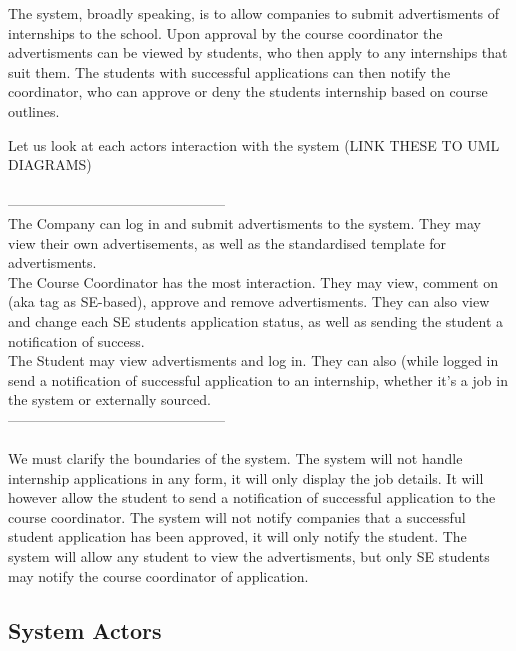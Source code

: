 \documentclass{l3deliverable}
\begin{document}

The system, broadly speaking, is to allow companies to submit advertisments 
of internships to the school. Upon approval by the course coordinator the 
advertisments can be viewed by students, who then apply to any internships 
that suit them. The students with successful applications can then notify 
the coordinator, who can approve or deny the students internship based on 
course outlines. 

Let us look at each actors interaction with the system (LINK THESE TO UML
DIAGRAMS)\\
\\
-----------------------------------------------\\
The Company can log in and submit advertisments to the system. They may 
view their own advertisements, as well as the standardised template for 
advertisments.\\

The Course Coordinator has the most interaction. They may view, comment 
on (aka tag as SE-based), approve and remove advertisments. They can also 
view and change each SE students application status, as well as sending 
the student a notification of success.\\

The Student may view advertisments and log in. They can also (while logged 
in send a notification of successful application to an internship, whether 
it's a job in the system or externally sourced.\\
-----------------------------------------------\\
\\
We must clarify the boundaries of the system. The system will not 
handle internship applications in any form, it will only display the 
job details. It will however allow the student to send a notification 
of successful application to the course coordinator. The system will 
not notify companies that a successful student application has been 
approved, it will only notify the student. The system will allow any 
student to view the advertisments, but only SE students may notify 
the course coordinator of application.


\subsection{System Actors}
\end{document}
